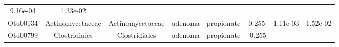 \documentclass[11pt,]{article}
\begin{document}
\begin{longtable}[]{@{}cccccccc@{}}
\begin{minipage}[t]{0.08\columnwidth}
9.16e-04\strut
\end{minipage} & \begin{minipage}[t]{0.08\columnwidth}\centering\strut
1.33e-02\strut
\end{minipage}\tabularnewline
\begin{minipage}[t]{0.08\columnwidth}\centering\strut
Otu00134\strut
\end{minipage} & \begin{minipage}[t]{0.15\columnwidth}\centering\strut
Actinomycetaceae\strut
\end{minipage} & \begin{minipage}[t]{0.15\columnwidth}\centering\strut
Actinomycetaceae\strut
\end{minipage} & \begin{minipage}[t]{0.08\columnwidth}\centering\strut
adenoma\strut
\end{minipage} & \begin{minipage}[t]{0.09\columnwidth}\centering\strut
propionate\strut
\end{minipage} & \begin{minipage}[t]{0.07\columnwidth}\centering\strut
0.255\strut
\end{minipage} & \begin{minipage}[t]{0.08\columnwidth}\centering\strut
1.11e-03\strut
\end{minipage} & \begin{minipage}[t]{0.08\columnwidth}\centering\strut
1.52e-02\strut
\end{minipage}\tabularnewline
\begin{minipage}[t]{0.08\columnwidth}\centering\strut
Otu00799\strut
\end{minipage} & \begin{minipage}[t]{0.15\columnwidth}\centering\strut
Clostridiales\strut
\end{minipage} & \begin{minipage}[t]{0.15\columnwidth}\centering\strut
Clostridiales\strut
\end{minipage} & \begin{minipage}[t]{0.08\columnwidth}\centering\strut
adenoma\strut
\end{minipage} & \begin{minipage}[t]{0.09\columnwidth}\centering\strut
propionate\strut
\end{minipage} & \begin{minipage}[t]{0.07\columnwidth}\centering\strut
-0.255\strut
\end{minipage} & \begin{minipage}[t]{0.08\columnwidth}\centering\strut

\end{minipage}
\end{longtable}
\end{document}
